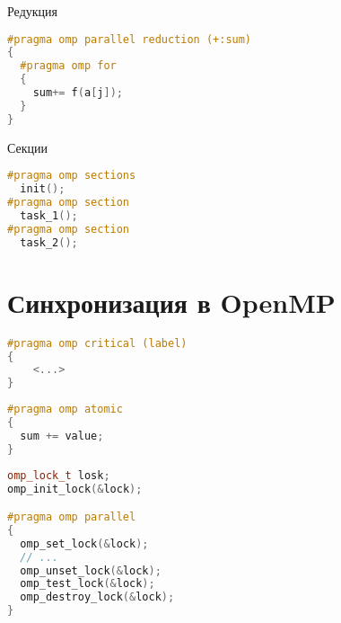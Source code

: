 \begin{frame}[fragile]{Редукция}

\begin{lstlisting}[language=C++,basicstyle=\ttfamily,keywordstyle=\color{blue},basicstyle=\scriptsize]
#pragma omp parallel reduction (+:sum)
{
  #pragma omp for
  {
    sum+= f(a[j]);
  }
}
\end{lstlisting}

\end{frame}

\begin{frame}[fragile]{Секции}

\begin{lstlisting}[language=C++,basicstyle=\ttfamily,keywordstyle=\color{blue},basicstyle=\scriptsize]
#pragma omp sections
  init();
#pragma omp section
  task_1();
#pragma omp section
  task_2();
\end{lstlisting}

\end{frame}

\section{Синхронизация в OpenMP}

\begin{frame}[fragile]

\begin{lstlisting}[language=C++,basicstyle=\ttfamily,keywordstyle=\color{blue},basicstyle=\scriptsize]
#pragma omp critical (label)
{
    <...>
}
\end{lstlisting}

\end{frame}

\begin{frame}[fragile]

\begin{lstlisting}[language=C++,basicstyle=\ttfamily,keywordstyle=\color{blue},basicstyle=\scriptsize]
#pragma omp atomic
{
  sum += value;
}
\end{lstlisting}

\end{frame}

\begin{frame}[fragile]

\begin{lstlisting}[language=C++,basicstyle=\ttfamily,keywordstyle=\color{blue},basicstyle=\scriptsize]
omp_lock_t losk;
omp_init_lock(&lock);

#pragma omp parallel
{
  omp_set_lock(&lock);
  // ...
  omp_unset_lock(&lock);
  omp_test_lock(&lock);
  omp_destroy_lock(&lock);
}
\end{lstlisting}

\end{frame}

